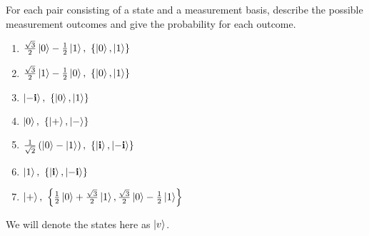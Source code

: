 \section{}

For each pair consisting of a state and a measurement basis, describe the possible
measurement outcomes and give the probability for each outcome.
\begin{enumerate}[label=\alph*.,ref={Ex.~\thesection\alph*}]
\label{ex:2p6}
    \item $\tfrac{\sqrt{3}}{2} \ket{0} - \tfrac{1}{2} \ket{1},~\left \{ \ket{0}, \ket{1} \right \}$
    \item $\tfrac{\sqrt{3}}{2} \ket{1} - \tfrac{1}{2} \ket{0},~\left \{ \ket{0}, \ket{1} \right \}$
    \item $\ket{- \mathbf{i}},~\left \{ \ket{0}, \ket{1} \right \}$
    \item $\ket{0},~\left \{ \ket{+}, \ket{-} \right \}$
    \item $\tfrac{1}{\sqrt{2}} \left ( \ket{0} - \ket{1} \right ),~\left \{ \ket{\mathbf{i}}, \ket{- \mathbf{i}} \right \}$
    \item $\ket{1},~\left \{ \ket{\mathbf{i}}, \ket{- \mathbf{i}} \right \}$
    \item $\ket{+},~\left \{ \tfrac{1}{2} \ket{0} + \tfrac{\sqrt{3}}{2} \ket{1}, \tfrac{\sqrt{3}}{2} \ket{0} - \tfrac{1}{2} \ket{1} \right \}$
\end{enumerate}

{\Sol}
We will denote the states here as $\ket{v}$.


